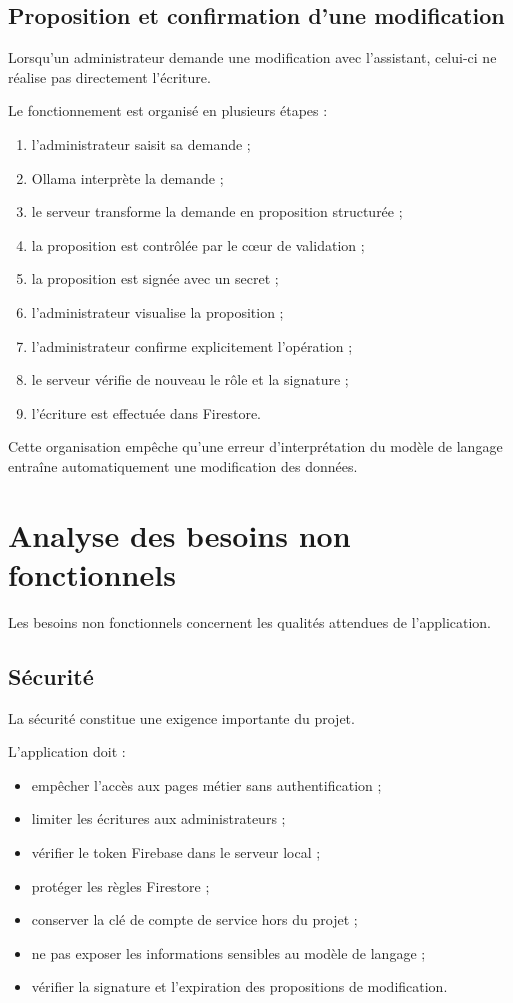 \documentclass{rapportENSIAS}
\begin{document}
\subsection{Proposition et confirmation d’une modification}

Lorsqu’un administrateur demande une modification avec l’assistant, celui-ci ne réalise pas directement l’écriture.

Le fonctionnement est organisé en plusieurs étapes :

\begin{enumerate}
\item l’administrateur saisit sa demande ;
\item Ollama interprète la demande ;
\item le serveur transforme la demande en proposition structurée ;
\item la proposition est contrôlée par le cœur de validation ;
\item la proposition est signée avec un secret ;
\item l’administrateur visualise la proposition ;
\item l’administrateur confirme explicitement l’opération ;
\item le serveur vérifie de nouveau le rôle et la signature ;
\item l’écriture est effectuée dans Firestore.
\end{enumerate}

Cette organisation empêche qu’une erreur d’interprétation du modèle de langage entraîne automatiquement une modification des données.

\section{Analyse des besoins non fonctionnels}

Les besoins non fonctionnels concernent les qualités attendues de l’application.

\subsection{Sécurité}

La sécurité constitue une exigence importante du projet.

L’application doit :

\begin{itemize}
\item empêcher l’accès aux pages métier sans authentification ;
\item limiter les écritures aux administrateurs ;
\item vérifier le token Firebase dans le serveur local ;
\item protéger les règles Firestore ;
\item conserver la clé de compte de service hors du projet ;
\item ne pas exposer les informations sensibles au modèle de langage ;
\item vérifier la signature et l’expiration des propositions de modification.
\end{itemize}
\end{document}
